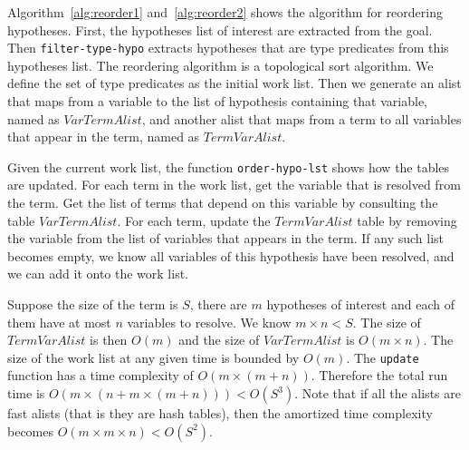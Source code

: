 \begin{algorithm}
  \DontPrintSemicolon

  \setcounter{AlgoLine}{21}
  \end{algorithm}

Algorithm~\ref{alg:reorder1} and~\ref{alg:reorder2} shows the algorithm for
reordering hypotheses. First, the hypotheses list of interest are extracted from
the goal. Then \texttt{filter-type-hypo} extracts hypotheses that are type
predicates from this hypotheses list. The reordering algorithm is a topological
sort algorithm. We define the set of type predicates as the initial work list.
Then we generate an alist that maps from a variable to the list of hypothesis
containing that variable, named as $VarTermAlist$, and another alist that maps
from a term to all variables that appear in the term, named as $TermVarAlist$.

Given the current work list, the function \texttt{order-hypo-lst} shows how the
tables are updated. For each term in the work list, get the variable that is
resolved from the term. Get the list of terms that depend on this variable by
consulting the table $VarTermAlist$. For each term, update the $TermVarAlist$
table by removing the variable from the list of variables that appears in the
term. If any such list becomes empty, we know all variables of this hypothesis
have been resolved, and we can add it onto the work list.

Suppose the size of the term is $S$, there are $m$ hypotheses of interest and
each of them have at most $n$ variables to resolve. We know $m\times n < S$.
The size of $TermVarAlist$ is then $O(m)$ and the size of $VarTermAlist$ is
$O(m\times n)$. The size of the work list at any given time is bounded by
$O(m)$. The \texttt{update} function has a time complexity of $O(m\times(m+n))$.
Therefore the total run time is $O(m\times(n+m\times(m+n))) < O(S^3)$.
Note that if all the alists are fast alists (that is they are hash tables), then
the amortized time complexity becomes $O(m\times m\times n) < O(S^2)$.

